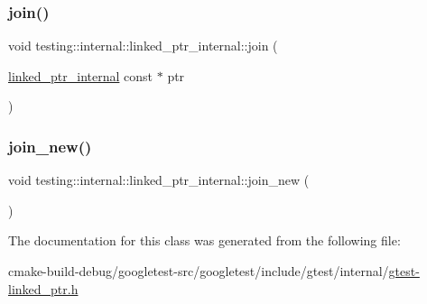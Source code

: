 \mbox{\label{classtesting_1_1internal_1_1linked__ptr__internal_acd5a341459f7e81b10b4112d8c764e2a}} 
\subsubsection{\texorpdfstring{join()}{join()}}
{\footnotesize\ttfamily void testing\+::internal\+::linked\+\_\+ptr\+\_\+internal\+::join (\begin{DoxyParamCaption}\item[{\mbox{\hyperlink{classtesting_1_1internal_1_1linked__ptr__internal}{linked\+\_\+ptr\+\_\+internal}} const $\ast$}]{ptr }\end{DoxyParamCaption})\hspace{0.3cm}{\ttfamily [inline]}}

\mbox{\label{classtesting_1_1internal_1_1linked__ptr__internal_a742af1f65df2d5e2b7198a1b74264a83}} 
\subsubsection{\texorpdfstring{join\_new()}{join\_new()}}
{\footnotesize\ttfamily void testing\+::internal\+::linked\+\_\+ptr\+\_\+internal\+::join\+\_\+new (\begin{DoxyParamCaption}{ }\end{DoxyParamCaption})\hspace{0.3cm}{\ttfamily [inline]}}



The documentation for this class was generated from the following file\+:\begin{DoxyCompactItemize}
\item 
cmake-\/build-\/debug/googletest-\/src/googletest/include/gtest/internal/\mbox{\hyperlink{gtest-linked__ptr_8h}{gtest-\/linked\+\_\+ptr.\+h}}\end{DoxyCompactItemize}
